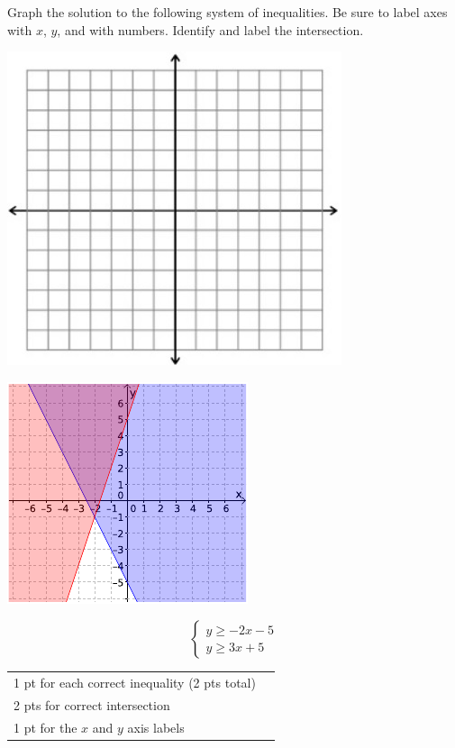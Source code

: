{
	Graph the solution to the following system of inequalities. Be sure to label axes with $x$, $y$, and with numbers. Identify and label the intersection. \begin{onlyproblem}\begin{center}\includegraphics{fig-graphpaper.png}\end{center}\end{onlyproblem} \begin{onlysolution}\begin{center}\includegraphics{fig095-12-c-answer}\end{center}\end{onlysolution}
	$$\begin{cases}y\geq -2x-5\\ y\geq 3x+5 \end{cases}$$
}
{
	\begin{tabular}{l r}
	1 pt for each correct inequality (2 pts total)\\
	2 pts for correct intersection\\
	1 pt for the $x$ and $y$ axis labels\\
	\end{tabular}
}

